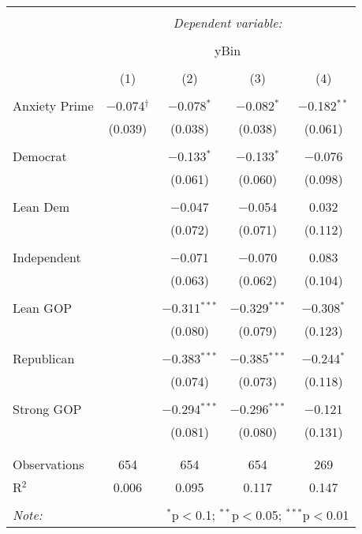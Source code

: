 
\begin{table}[!htbp] \centering 
  \caption{} 
  \label{} 
\begin{tabular}{@{\extracolsep{5pt}}lcccc} 
\\[-1.8ex]\hline 
\hline \\[-1.8ex] 
 & \multicolumn{4}{c}{\textit{Dependent variable:}} \\ 
\cline{2-5} 
\\[-1.8ex] & \multicolumn{4}{c}{yBin} \\ 
\\[-1.8ex] & (1) & (2) & (3) & (4)\\ 
\hline \\[-1.8ex] 
 Anxiety Prime & $-$0.074$^{\dag}$ & $-$0.078$^{*}$ & $-$0.082$^{*}$ & $-$0.182$^{**}$ \\ 
  & (0.039) & (0.038) & (0.038) & (0.061) \\ 
  & & & & \\ 
 Democrat &  & $-$0.133$^{*}$ & $-$0.133$^{*}$ & $-$0.076 \\ 
  &  & (0.061) & (0.060) & (0.098) \\ 
  & & & & \\ 
 Lean Dem &  & $-$0.047 & $-$0.054 & 0.032 \\ 
  &  & (0.072) & (0.071) & (0.112) \\ 
  & & & & \\ 
 Independent &  & $-$0.071 & $-$0.070 & 0.083 \\ 
  &  & (0.063) & (0.062) & (0.104) \\ 
  & & & & \\ 
 Lean GOP &  & $-$0.311$^{***}$ & $-$0.329$^{***}$ & $-$0.308$^{*}$ \\ 
  &  & (0.080) & (0.079) & (0.123) \\ 
  & & & & \\ 
 Republican &  & $-$0.383$^{***}$ & $-$0.385$^{***}$ & $-$0.244$^{*}$ \\ 
  &  & (0.074) & (0.073) & (0.118) \\ 
  & & & & \\ 
 Strong GOP &  & $-$0.294$^{***}$ & $-$0.296$^{***}$ & $-$0.121 \\ 
  &  & (0.081) & (0.080) & (0.131) \\ 
  & & & & \\ 
\hline \\[-1.8ex] 
Observations & 654 & 654 & 654 & 269 \\ 
R$^{2}$ & 0.006 & 0.095 & 0.117 & 0.147 \\ 
\hline 
\hline \\[-1.8ex] 
\textit{Note:}  & \multicolumn{4}{r}{$^{*}$p$<$0.1; $^{**}$p$<$0.05; $^{***}$p$<$0.01} \\ 
\end{tabular} 
\end{table} 
